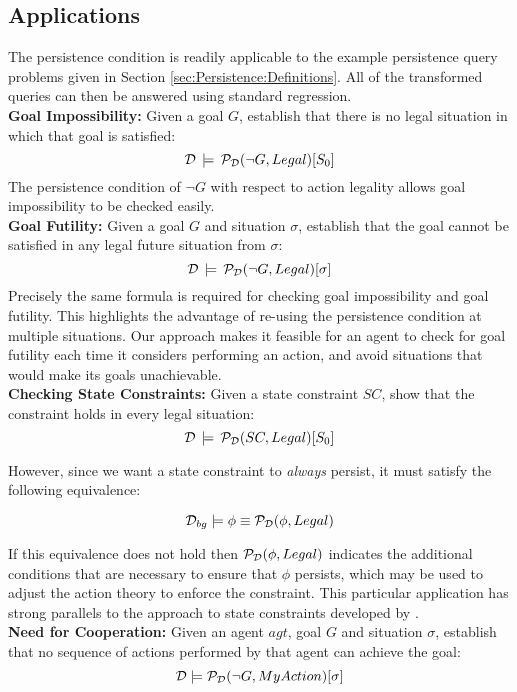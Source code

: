 \subsection{Applications}

The persistence condition is readily applicable to the example persistence
query problems given in Section \ref{sec:Persistence:Definitions}.
All of the transformed queries can then be answered using standard
regression.\\


\textbf{Goal Impossibility:} Given a goal $G$, establish that there
is no legal situation in which that goal is satisfied:\[
\mathcal{D}\,\models\,\mathcal{P}_{\mathcal{D}}(\neg G,Legal)[S_{0}]\]
 The persistence condition of $\neg G$ with respect to action legality
allows goal impossibility to be checked easily.\\


\textbf{Goal Futility:} Given a goal $G$ and situation $\sigma$,
establish that the goal cannot be satisfied in any legal future situation
from $\sigma$:\[
\mathcal{D}\,\models\,\mathcal{P}_{\mathcal{D}}(\neg G,Legal)[\sigma]\]
 Precisely the same formula is required for checking goal impossibility
and goal futility. This highlights the advantage of re-using the persistence
condition at multiple situations. Our approach makes it feasible for
an agent to check for goal futility each time it considers performing
an action, and avoid situations that would make its goals unachievable.\\


\textbf{Checking State Constraints:} Given a state constraint $SC$,
show that the constraint holds in every legal situation:\[
\mathcal{D}\,\models\,\mathcal{P}_{\mathcal{D}}(SC,Legal)[S_{0}]\]


However, since we want a state constraint to \emph{always} persist,
it must satisfy the following equivalence:

\[
\mathcal{D}_{bg}\models\phi\equiv\mathcal{P}_{\mathcal{D}}(\phi,Legal)\]


If this equivalence does not hold then $\mathcal{P}_{\mathcal{D}}(\phi,Legal)$ indicates
the additional conditions that are necessary to ensure that $\phi$
persists, which may be used to adjust the action theory to enforce
the constraint. This particular application has strong parallels to
the approach to state constraints developed by \citet{Lin94-StateConstraints}.\\


\textbf{Need for Cooperation:} Given an agent $agt$, goal $G$ and
situation $\sigma$, establish that no sequence of actions performed
by that agent can achieve the goal:\[
\mathcal{D}\models\mathcal{P}_{\mathcal{D}}(\neg G,MyAction)[\sigma]\]


